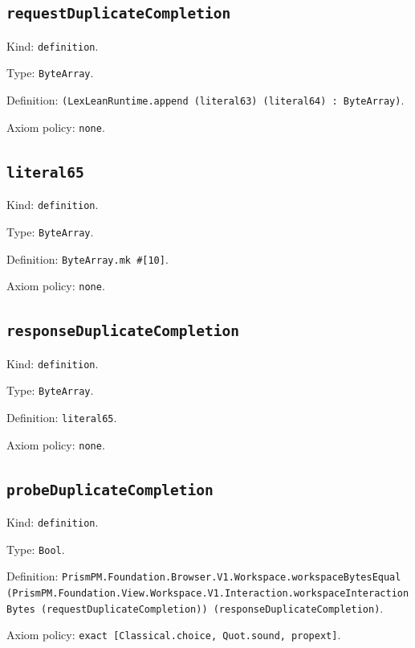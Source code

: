 \documentclass[11pt]{article}
\begin{document}
\subsection*{\texttt{requestDuplicateCompletion}}
\noindent Kind: \texttt{definition}.\par
\noindent Type: \texttt{ByteArray}.\par
\noindent Definition: \texttt{(LexLeanRuntime.append (literal63) (literal64) : ByteArray)}.\par
\noindent Axiom policy: \texttt{none}.\par
\subsection*{\texttt{literal65}}
\noindent Kind: \texttt{definition}.\par
\noindent Type: \texttt{ByteArray}.\par
\noindent Definition: \texttt{ByteArray.mk \#[10]}.\par
\noindent Axiom policy: \texttt{none}.\par
\subsection*{\texttt{responseDuplicateCompletion}}
\noindent Kind: \texttt{definition}.\par
\noindent Type: \texttt{ByteArray}.\par
\noindent Definition: \texttt{literal65}.\par
\noindent Axiom policy: \texttt{none}.\par
\subsection*{\texttt{probeDuplicateCompletion}}
\noindent Kind: \texttt{definition}.\par
\noindent Type: \texttt{Bool}.\par
\noindent Definition: \texttt{PrismPM.Foundation.Browser.V1.Workspace.workspaceBytesEqual (PrismPM.Foundation.View.Workspace.V1.Interaction.workspaceInteractionBytes (requestDuplicateCompletion)) (responseDuplicateCompletion)}.\par
\noindent Axiom policy: \texttt{exact [Classical.choice, Quot.sound, propext]}.\par
\end{document}

